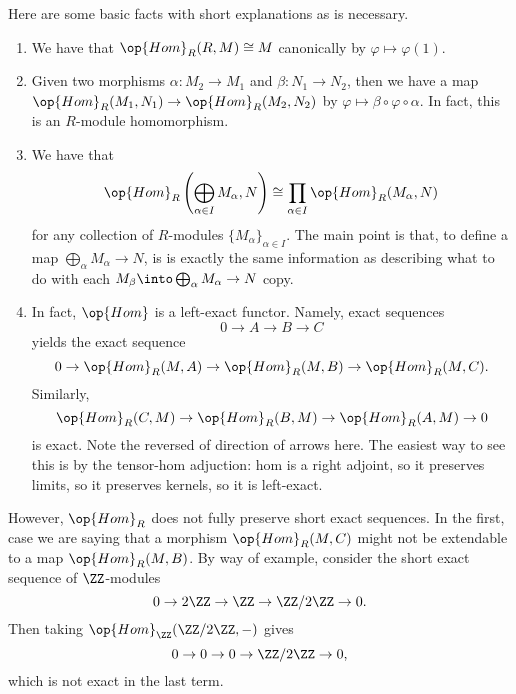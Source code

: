 Here are some basic facts with short explanations as is necessary.
\begin{enumerate}
	\item We have that $\op{Hom}_R(R,M)\cong M$ canonically by $\varphi\mapsto\varphi(1)$.
	\item Given two morphisms $\alpha:M_2\to M_1$ and $\beta:N_1\to N_2$, then we have a map $\op{Hom}_R(M_1,N_1)\to\op{Hom}_R(M_2,N_2)$ by $\varphi\mapsto\beta\circ\varphi\circ\alpha$. In fact, this is an $R$-module homomorphism.
	\item We have that
	\[\op{Hom}_R\left(\bigoplus_{\alpha\in I}M_\alpha,N\right)\cong\prod_{\alpha\in I}\op{Hom}_R(M_\alpha,N)\]
	for any collection of $R$-modules $\{M_\alpha\}_{\alpha\in I}$. The main point is that, to define a map $\bigoplus_\alpha M_\alpha\to N$, is is exactly the same information as describing what to do with each $M_\beta\into\bigoplus_\alpha M_\alpha\to N$ copy.
	\item In fact, $\op{Hom}$ is a left-exact functor. Namely, exact sequences
	\[0\to A\to B\to C\]
	yields the exact sequence
	\[0\to\op{Hom}_R(M,A)\to\op{Hom}_R(M,B)\to\op{Hom}_R(M,C).\]
	Similarly,
	\[\op{Hom}_R(C,M)\to\op{Hom}_R(B,M)\to\op{Hom}_R(A,M)\to0\]
	is exact. Note the reversed of direction of arrows here. The easiest way to see this is by the tensor-hom adjuction: hom is a right adjoint, so it preserves limits, so it preserves kernels, so it is left-exact.
\end{enumerate}
\begin{remark}
	However, $\op{Hom}_R$ does not fully preserve short exact sequences. In the first, case we are saying that a morphism $\op{Hom}_R(M,C)$ might not be extendable to a map $\op{Hom}_R(M,B)$. By way of example, consider the short exact sequence of $\ZZ$-modules
	\[0\to2\ZZ\to\ZZ\to\ZZ/2\ZZ\to0.\]
	Then taking $\op{Hom}_\ZZ(\ZZ/2\ZZ,-)$ gives
	\[0\to0\to0\to\ZZ/2\ZZ\to0,\]
	which is not exact in the last term.
\end{remark}

